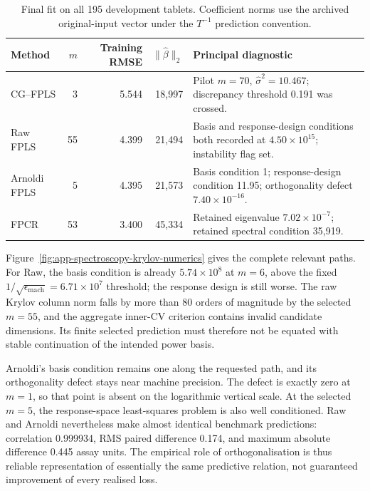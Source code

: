 \begin{table}[htbp]
    \centering
    \small
    \caption[Final-fit numerical diagnostics]{Final fit on all 195 development tablets.  Coefficient norms use
    the archived original-input vector under the $T^{-1}$ prediction
    convention.}
    \label{tab:app-spectroscopy-final-diagnostics}
    \begin{tabular}{@{}lrrrp{6.0cm}@{}}
        \toprule
        Method & $m$ & Training RMSE & $\|\widehat\beta\|_2$ & Principal diagnostic \\
        \midrule
        CG--FPLS & 3 & 5.544 & 18,997
          & Pilot $m=70$, $\widehat\sigma^2=10.467$; discrepancy threshold
            0.191 was crossed. \\
        Raw FPLS & 55 & 4.399 & 21,494
          & Basis and response-design conditions both recorded at
            $4.50\times10^{15}$; instability flag set. \\
        Arnoldi FPLS & 5 & 4.395 & 21,573
          & Basis condition 1; response-design condition 11.95; orthogonality
            defect $7.40\times10^{-16}$. \\
        FPCR & 53 & 3.400 & 45,334
          & Retained eigenvalue $7.02\times10^{-7}$; retained spectral
            condition 35,919. \\
        \bottomrule
    \end{tabular}
\end{table}

Figure~\ref{fig:app-spectroscopy-krylov-numerics} gives the complete relevant
paths.  For Raw, the basis condition is already $5.74\times10^8$ at $m=6$,
above the fixed $1/\sqrt{\epsilon_{\mathrm{mach}}}=6.71\times10^7$ threshold;
the response design is still worse.  The raw Krylov column norm falls by more
than 80 orders of magnitude by the selected $m=55$, and the aggregate inner-CV
criterion contains invalid candidate dimensions.  Its finite selected
prediction must therefore not be equated with stable continuation of the
intended power basis.

Arnoldi's basis condition remains one along the requested path, and its
orthogonality defect stays near machine precision.  The defect is exactly zero
at $m=1$, so that point is absent on the logarithmic vertical scale.  At the
selected $m=5$, the response-space least-squares problem is also well
conditioned.  Raw and Arnoldi nevertheless make almost identical benchmark
predictions: correlation 0.999934, RMS paired difference 0.174, and maximum
absolute difference 0.445 assay units.  The empirical role of orthogonalisation
is thus reliable representation of essentially the same predictive relation,
not guaranteed improvement of every realised loss.

